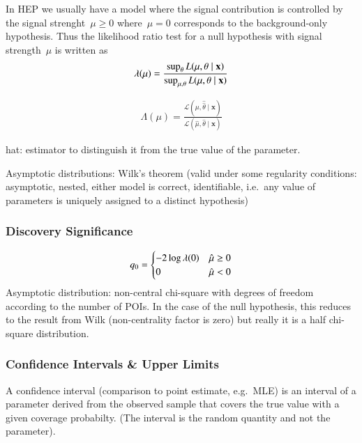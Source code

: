 In HEP we usually have a model where the signal contribution is
controlled by the signal strenght~$\mu \geq 0$ where~$\mu = 0$
corresponds to the background-only hypothesis. Thus the likelihood
ratio test for a null hypothesis with signal strength~$\mu$ is written as
\begin{align}
  \lambda(\mu) = \frac{\sup_\theta L(\mu, \theta \mid \mathbf{x})}{\sup_{\mu,\theta} L(\mu, \theta \mid \mathbf{x})}
\end{align}


\begin{align*}
  \Lambda(\mu) = \frac{\mathcal{L}\left( \mu, \hat{\hat{\theta}} \mid \mathbf{x} \right)}
                      {\mathcal{L}\left( \hat{\mu}, \hat{\theta} \mid \mathbf{x} \right)}
\end{align*}

hat: estimator to distinguish it from the true value of the parameter.

Asymptotic distributions: Wilk's theorem (valid under some regularity
conditions: asymptotic, nested, either model is correct, identifiable,
i.e.\ any value of parameters is uniquely assigned to a distinct
hypothesis)



\subsubsection{Discovery Significance}

\begin{align}
  q_0 =
  \begin{cases}
    -2 \log \lambda(0) & \hat{\mu} \geq 0 \\
    0 & \hat{\mu} < 0
  \end{cases}
\end{align}
Asymptotic distribution: non-central chi-square with degrees of
freedom according to the number of POIs. In the case of the null
hypothesis, this reduces to the result from Wilk (non-centrality
factor is zero) but really it is a half chi-square distribution.


\subsubsection{Confidence Intervals \& Upper Limits}

A confidence interval (comparison to point estimate, e.g.\ MLE) is an
interval of a parameter derived from the observed sample that covers
the true value with a given coverage probabilty. (The interval is the
random quantity and not the parameter).

